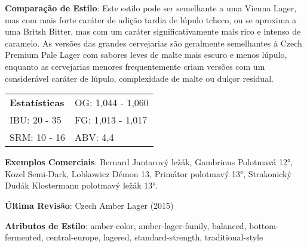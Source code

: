 \textbf{Comparação de Estilo}: Este estilo pode ser semelhante a uma Vienna Lager, mas com mais forte caráter de adição tardia de lúpulo tcheco, ou se aproxima a uma Britsh Bitter, mas com um caráter significativamente mais rico e intenso de caramelo. As versões das grandes cervejarias são geralmente semelhantes à Czech Premium Pale Lager com sabores leves de malte mais escuro e menos lúpulo, enquanto as cervejarias menores frequentemente criam versões com um considerável caráter de lúpulo, complexidade de malte ou dulçor residual.

\begin{tabular}{@{}p{35mm}p{35mm}@{}}
  \textbf{Estatísticas} & OG: 1,044 - 1,060 \\
  IBU: 20 - 35  & FG: 1,013 - 1,017  \\
  SRM: 10 - 16   & ABV: 4,4%
\end{tabular}

\textbf{Exemplos Comerciais}: Bernard Jantarový ležák, Gambrinus Polotmavá 12°, Kozel Semi-Dark, Lobkowicz Démon 13, Primátor polotmavý 13°, Strakonický Dudák Klostermann polotmavý ležák 13°.

\textbf{Última Revisão}: Czech Amber Lager (2015)

\textbf{Atributos de Estilo}: amber-color, amber-lager-family, balanced, bottom-fermented, central-europe, lagered, standard-strength, traditional-style

